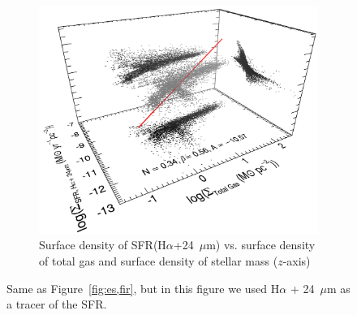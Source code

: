{\begin{figure}
\begin{subfigure}[b]{0.5\textwidth}
        \label{fig:es,all,halpha,hi}
    \end{subfigure}
    \hfill
    \begin{subfigure}[b]{0.5\textwidth}
        \centering
        \includegraphics[width=\textwidth]{../image_paper1/es_tot_halpha_vs_tot2_f.png}
        \caption{Surface density of SFR(H$\alpha$+24~$\mu$m) vs. surface density of total gas and surface density of stellar mass ($z$-axis)}
        \label{fig:es,all,halpha,tot}
    \end{subfigure}
    \caption{Same as Figure~\ref{fig:es,fir}, but in this figure we used H$\alpha$ + 24~$\mu$m as a tracer of the SFR.}
\end{figure}


}